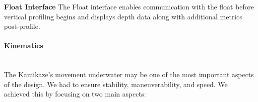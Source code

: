 \vspace{0.2cm}
\textbf{Float Interface}
The Float interface enables communication with the float before vertical profiling begins and displays depth data along with additional metrics post-profile.

\vspace{-0.3cm}
\paragraph{Kinematics} \ \\
The Kamikaze's movement underwater may be one of the most important aspects of the design. We had to ensure stability, maneuverability, and speed. We achieved this by focusing on two main aspects:

\vspace{-0.5\baselineskip}

